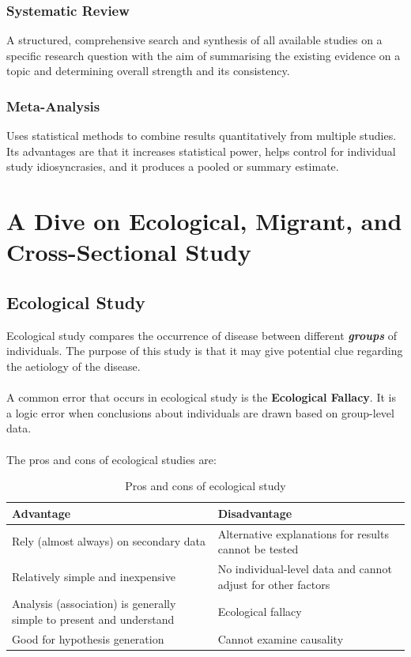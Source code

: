 \documentclass{article}
\begin{document}
\subsubsection*{Systematic Review}
A structured, comprehensive search and synthesis of all available studies on a specific research question with the aim of summarising the existing evidence on a topic and determining overall strength and its consistency.

\subsubsection*{Meta-Analysis}
Uses statistical methods to combine results quantitatively from multiple studies. Its advantages are that it increases statistical power, helps control for individual study idiosyncrasies, and it produces a pooled or summary estimate.


\pagebreak
\section{A Dive on Ecological, Migrant, and Cross-Sectional Study}
\subsection{Ecological Study}
Ecological study compares the occurrence of disease between different \textbf{\textit{groups}} of individuals. The purpose of this study is that it may give potential clue regarding the aetiology of the disease.
\\~\\
A common error that occurs in ecological study is the \textbf{Ecological Fallacy}. It is a logic error when conclusions about individuals are drawn based on group-level data.
\\~\\
The pros and cons of ecological studies are:

\begin{table}[H]
\centering
\begin{tabularx}{\textwidth}{|X|X|}
\hline
\textbf{Advantage} & \textbf{Disadvantage} \\ \hline
Rely (almost always) on secondary data & Alternative explanations for results cannot be tested \\ \hline
Relatively simple and inexpensive & No individual-level data and cannot adjust for other factors \\ \hline
Analysis (association) is generally simple to present and understand & Ecological fallacy \\ \hline
Good for hypothesis generation           & Cannot examine causality \\ \hline
\end{tabularx}
\caption{Pros and cons of ecological study}
\label{tab:pros-cons-eco-study}
\end{table}
\end{document}

